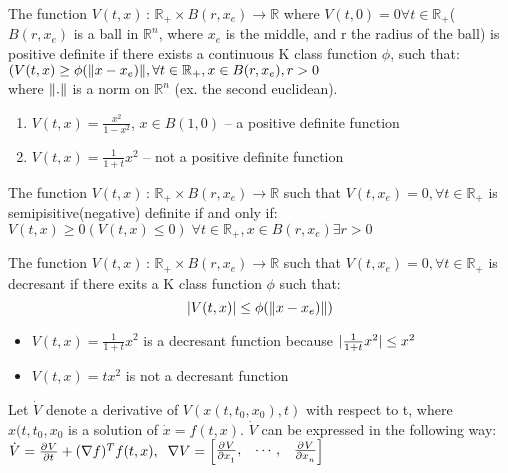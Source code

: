{
    The function $V(t,x)\,:\,\mathbb{R}_+ \times B(r,x_e) \longrightarrow \mathbb{R}$ where $V(t,0) = 0 \forall t \in \mathbb{R}_+ $( $B(r,x_e )$ is a ball in $\mathbb{R}^{n}$, where $x_e$ is the middle, and r the radius of the ball) is positive definite if there exists a continuous K class function $\phi $, such that:\\
    $(V(t,x) \ge \phi(\lVert x-x_e)\rVert, \forall t \in \mathbb{R}_+, x \in B(r,x_e), r > 0$ \\
    where $\lVert.\rVert$ is a norm on $\mathbb{R}^{n}$ (ex. the second euclidean). 
    \ex{}
    {
        \begin{enumerate}
            \item $V(t,x) = \frac{x^{2}}{1-x^{2}}$, $x \in B(1,0)$ -- a positive definite function
            \item $V(t,x) = \frac{1}{1+t}x^{2}$ -- not a positive definite function
        \end{enumerate}
    }
}
{
    The function $V(t,x)\,:\,\mathbb{R}_+\times B(r,x_e) \longrightarrow  \mathbb{R} $ such that $V(t,x_e) = 0, \forall t \in  \mathbb{R}_+ $ is semipisitive(negative) definite if and only if:\\
    $V(t,x) \ge 0 (V(t,x) \le 0) \; \forall t \in \mathbb{R}_+, x\in B(r,x_e) \exists r >0 $
}
{
    The function $V(t,x)\,:\,\mathbb{R}_+\times B(r,x_e) \longrightarrow  \mathbb{R} $ such that $V(t,x_e) = 0, \forall t \in  \mathbb{R}_+ $ is decresant if there exits a K class function $\phi $ such that:\\
    \begin{equation}
        \label{dfn:decf}
    \lvert V(t,x)\rvert \le \phi (\lVert x-x_e)\rVert)
    \end{equation}

    \ex{}
    {
        \begin{itemize}
            \item $V(t,x) = \frac{1}{1+t}x^{2} $ is a decresant function because $\lvert \frac{1}{1+t}x^{2}\rvert\le x^{2}$
            \item $V(t,x) = tx^{2}$ is not a decresant function
                
        \end{itemize}
    }
    
}
\nt
{
    Let $\dot{V}$ denote a derivative of $V(x(t,t_0,x_0),t)$ with respect to t, where $x(t,t_0,x_0$ is a solution of $\dot{x} = f(t,x)$. $\dot{V}$ can be expressed in the following way:\\
    $\dot{V} = \frac{\partial^{}V}{\partial t^{}} + (\nabla f)^{T}f(t,x),\; \; \nabla V = \begin{bmatrix}
        \frac{\partial^{}V}{\partial x_1^{}}, & \cdots, & \frac{\partial^{}V}{\partial x_n^{}}  
    \end{bmatrix}$
}
